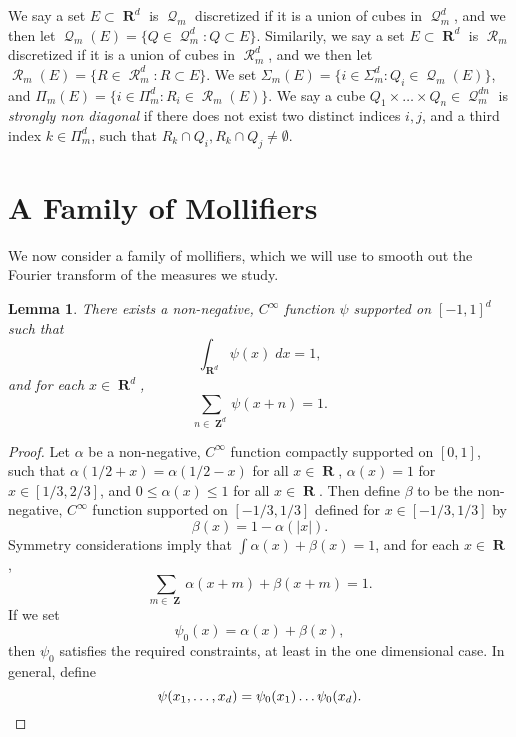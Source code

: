 \documentclass[12pt,reqno]{article}
\newtheorem{lemma}[theorem]{Lemma}
\DeclareMathOperator{\RR}{\mathbf{R}}
\DeclareMathOperator{\ZZ}{\mathbf{Z}}
\DeclareMathOperator{\DQ}{\mathcal{Q}}
\DeclareMathOperator{\DR}{\mathcal{R}}
\begin{document}
We say a set $E \subset \RR^d$ is $\DQ_m$ discretized if it is a union of cubes in $\DQ_m^d$, and we then let $\DQ_m(E) = \{ Q \in \DQ_m^d : Q \subset E \}$. Similarily, we say a set $E \subset \RR^d$ is $\DR_m$ discretized if it is a union of cubes in $\DR_m^d$, and we then let $\DR_m(E) = \{ R \in \DR_m^d : R \subset E \}$. We set $\Sigma_m(E) = \{ i \in \Sigma_m^d : Q_i \in \DQ_m(E) \}$, and $\Pi_m(E) = \{ i \in \Pi_m^d : R_i \in \DR_m(E) \}$. We say a cube $Q_1 \times \dots \times Q_n \in \DQ_m^{dn}$ is \emph{strongly non diagonal} if there does not exist two distinct indices $i,j$, and a third index $k \in \Pi_m^d$, such that $R_k \cap Q_i, R_k \cap Q_j \neq \emptyset$.

\section{A Family of Mollifiers}

We now consider a family of mollifiers, which we will use to smooth out the Fourier transform of the measures we study.

\begin{lemma} \label{lemma19020941290}
    There exists a non-negative, $C^\infty$ function $\psi$ supported on $[-1,1]^d$ such that
    \begin{equation} \label{equation1249015901590190}
        \int_{\RR^d} \psi(x)\; dx = 1,
    \end{equation}
    and for each $x \in \RR^d$,
    \begin{equation} \label{equation50914902149012}
        \sum_{n \in \ZZ^d} \psi(x + n) = 1.
    \end{equation}
\end{lemma}
\begin{proof}
    Let $\alpha$ be a non-negative, $C^\infty$ function compactly supported on $[0,1]$, such that $\alpha(1/2 + x) = \alpha(1/2 - x)$ for all $x \in \RR$, $\alpha(x) = 1$ for $x \in [1/3,2/3]$, and $0 \leq \alpha(x) \leq 1$ for all $x \in \RR$. Then define $\beta$ to be the non-negative, $C^\infty$ function supported on $[-1/3,1/3]$ defined for $x \in [-1/3,1/3]$ by
    \[ \beta(x) = 1 - \alpha(|x|). \]
    Symmetry considerations imply that $\int \alpha(x) + \beta(x) = 1$, and for each $x \in \RR$,
    \begin{equation} \label{equation129410294910}
        \sum_{m \in \ZZ} \alpha(x + m) + \beta(x + m) = 1.
    \end{equation}
    If we set
    \[ \psi_0(x) = \alpha(x) + \beta(x), \]
    then $\psi_0$ satisfies the required constraints, at least in the one dimensional case. In general, define
    \[ \psi(x_1, \dots, x_d) = \psi_0(x_1) \dots \psi_0(x_d). \qedhere \]
\end{proof}
\end{document}
